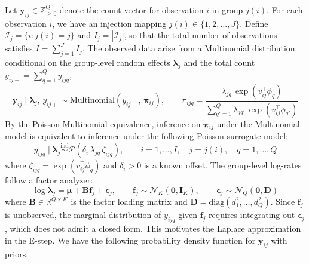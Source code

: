 \documentclass[]{report}
\theoremstyle{definition}
\begin{document}
	
\thispagestyle{empty}

Let $\bm{y}_{ij} \in \mathbb{Z}_{\geq 0}^Q$ denote the count vector for observation $i$ in group $j(i)$. For each observation $i$, we have an injection mapping $j(i) \in \{1, 2, \ldots, J\}$. Define $\mathcal{I}_j = \{i : j(i) = j\}$ and $I_j = |\mathcal{I}_j|$, so that the total number of observations satisfies $I = \sum_{j=1}^J I_j$.
The observed data arise from a Multinomial distribution: conditional on the group-level random effects $\boldsymbol{\lambda}_{j}$ and the total count $y_{ij+} = \sum_{q=1}^Q y_{ijq}$,
\begin{equation}
    \bm{y}_{ij} \mid \boldsymbol{\lambda}_{j},\, y_{ij+} 
    \sim \text{Multinomial}\left(y_{ij+},\, \boldsymbol{\pi}_{ij}\right),
    \qquad 
    \pi_{ijq} = \frac{\lambda_{jq}\,\exp(v_{ij}^\top \phi_q)}
    {\sum_{q'=1}^Q \lambda_{jq'}\,\exp(v_{ij}^\top \phi_{q'})}
\end{equation}
By the Poisson-Multinomial equivalence, inference on $\boldsymbol{\pi}_{ij}$ under the Multinomial model is equivalent to inference under the following Poisson surrogate model:
\begin{equation}
    y_{ijq} \mid \bm{\lambda}_{j} \overset{\text{ind}}{\sim} 
    \mathcal{P}\!\left(\delta_i\,\lambda_{jq}\,
    \zeta_{ijq}\right), 
    \qquad i = 1,\ldots,I, \quad j = j(i), \quad q = 1,\ldots,Q
\end{equation}
where $\zeta_{ijq}=\exp(v_{ij}^\top\phi_q)$ and $\delta_i > 0$ is a known offset. The group-level log-rates follow a factor analyzer:
\begin{equation}
    \log\boldsymbol{\lambda}_j = \boldsymbol{\mu} + \mathbf{B}\mathbf{f}_j 
    + \boldsymbol{\epsilon}_j, \qquad 
    \mathbf{f}_j \sim \mathcal{N}_K(\mathbf{0}, \mathbf{I}_K), \qquad
    \boldsymbol{\epsilon}_j \sim \mathcal{N}_Q(\mathbf{0}, \mathbf{D})
\end{equation}
where $\mathbf{B} \in \mathbb{R}^{Q \times K}$ is the factor loading matrix and $\mathbf{D} = \mathrm{diag}(d_1^2, \ldots, d_Q^2)$. Since $\mathbf{f}_j$ is unobserved, the marginal distribution of $y_{ijq}$ given $\mathbf{f}_j$ requires integrating out $\boldsymbol{\epsilon}_j$, which does not admit a closed form. This motivates the Laplace approximation in the E-step.
We have the following probability density function for $\bm{y}_{ij}$ with priors.
\end{document}
